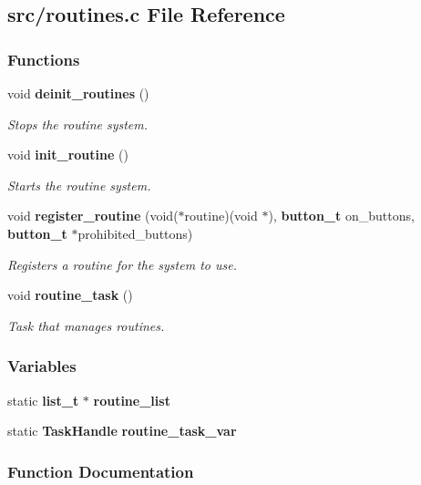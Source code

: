 \subsection{src/routines.c File Reference}
\label{routines_8c}
\subsubsection*{Functions}
\begin{DoxyCompactItemize}
\item 
void \textbf{ deinit\+\_\+routines} ()
\begin{DoxyCompactList}\small\item\em Stops the routine system. \end{DoxyCompactList}\item 
void \textbf{ init\+\_\+routine} ()
\begin{DoxyCompactList}\small\item\em Starts the routine system. \end{DoxyCompactList}\item 
void \textbf{ register\+\_\+routine} (void($\ast$routine)(void $\ast$), \textbf{ button\+\_\+t} on\+\_\+buttons, \textbf{ button\+\_\+t} $\ast$prohibited\+\_\+buttons)
\begin{DoxyCompactList}\small\item\em Registers a routine for the system to use. \end{DoxyCompactList}\item 
void \textbf{ routine\+\_\+task} ()
\begin{DoxyCompactList}\small\item\em Task that manages routines. \end{DoxyCompactList}\end{DoxyCompactItemize}
\subsubsection*{Variables}
\begin{DoxyCompactItemize}
\item 
static \textbf{ list\+\_\+t} $\ast$ \textbf{ routine\+\_\+list}
\item 
static \textbf{ Task\+Handle} \textbf{ routine\+\_\+task\+\_\+var}
\end{DoxyCompactItemize}


\subsubsection{Function Documentation}
\mbox{\label{routines_8c_ad908adbc884189372f72f882ec62d71d}} 
